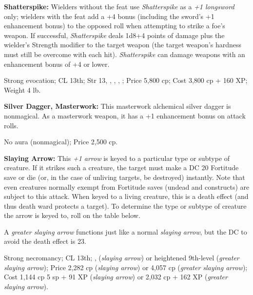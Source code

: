 \textbf{Shatterspike:} Wielders without the  feat use \emph{Shatterspike} as a \emph{+1 longsword} only; wielders with the  feat add a +4 bonus (including the sword's +1 enhancement bonus) to the opposed roll when attempting to strike a foe's weapon. If successful, \emph{Shatterspike} deals 1d8+4 points of damage plus the wielder's Strength modifier to the target weapon (the target weapon's hardness must still be overcome with each hit). \emph{Shatterspike} can damage weapons with an enhancement bonus of +4 or lower.

Strong evocation; CL 13th; Str 13, , , , ; Price 5,800 cp; Cost 3,800 cp + 160 XP; Weight 4 lb.




\textbf{Silver Dagger, Masterwork:} This masterwork alchemical silver dagger is nonmagical. As a masterwork weapon, it has a +1 enhancement bonus on attack rolls.

No aura (nonmagical); Price 2,500 cp.


\textbf{Slaying Arrow:} This \emph{+1 arrow} is keyed to a particular type or subtype of creature. If it strikes such a creature, the target must make a DC 20 Fortitude save or die (or, in the case of unliving targets, be destroyed) instantly. Note that even creatures normally exempt from Fortitude saves (undead and constructs) are subject to this attack. When keyed to a living creature, this is a death effect (and thus death ward protects a target). To determine the type or subtype of creature the arrow is keyed to, roll on the table below.

A \emph{greater slaying arrow} functions just like a normal \emph{slaying arrow}, but the DC to avoid the death effect is 23.

Strong necromancy; CL 13th; ,  (\emph{slaying arrow}) or heightened 9th-level  (\emph{greater slaying arrow}); Price 2,282 cp (\emph{slaying arrow}) or 4,057 cp (\emph{greater slaying arrow}); Cost 1,144 cp 5 sp + 91 XP (\emph{slaying arrow}) or 2,032 cp + 162 XP (\emph{greater slaying arrow}).


